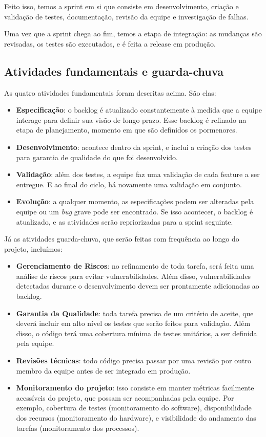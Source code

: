 \documentclass[12pt]{article}
\begin{document}
Feito isso, temos a sprint em si que consiste em desenvolvimento, criação e validação de testes, documentação, revisão da equipe e investigação de falhas.

Uma vez que a sprint chega ao fim, temos a etapa de integração: as mudanças são revisadas, os testes são executados, e é feita a release em produção.

\subsection*{Atividades fundamentais e guarda-chuva}

As quatro atividades fundamentais foram descritas acima. São elas:

\begin{itemize}
	\item \textbf{Especificação}: o backlog é atualizado constantemente à medida que a equipe interage para definir sua visão de longo prazo. Esse backlog é refinado na etapa de planejamento, momento em que são definidos os pormenores.
	\item \textbf{Desenvolvimento}: acontece dentro da sprint, e inclui a criação dos testes para garantia de qualidade do que foi desenvolvido.
	\item \textbf{Validação}: além dos testes, a equipe faz uma validação de cada feature a ser entregue. E ao final do ciclo, há novamente uma validação em conjunto.
	\item \textbf{Evolução}: a qualquer momento, as especificações podem ser alteradas pela equipe ou um \textit{bug} grave pode ser encontrado. Se isso acontecer, o backlog é atualizado, e as atividades serão repriorizadas para a sprint seguinte.
\end{itemize}

Já as atividades guarda-chuva, que serão feitas com frequência ao longo do projeto, incluímos:
\begin{itemize}
	\item \textbf{Gerenciamento de Riscos}: no refinamento de toda tarefa, será feita uma análise de riscos para evitar vulnerabilidades. Além disso, vulnerabilidades detectadas durante o desenvolvimento devem ser prontamente adicionadas ao backlog.
	\item \textbf{Garantia da Qualidade}: toda tarefa precisa de um critério de aceite, que deverá incluir em alto nível os testes que serão feitos para validação. Além disso, o código terá uma cobertura mínima de testes unitários, a ser definida pela equipe.
	\item \textbf{Revisões técnicas}: todo código precisa passar por uma revisão por outro membro da equipe antes de ser integrado em produção.
	\item \textbf{Monitoramento do projeto}: isso consiste em manter métricas facilmente acessíveis do projeto, que possam ser acompanhadas pela equipe. Por exemplo, cobertura de testes (monitoramento do software), disponibilidade dos recursos (monitoramento do hardware), e visibilidade do andamento das tarefas (monitoramento dos processos).
\end{itemize}
\end{document}
